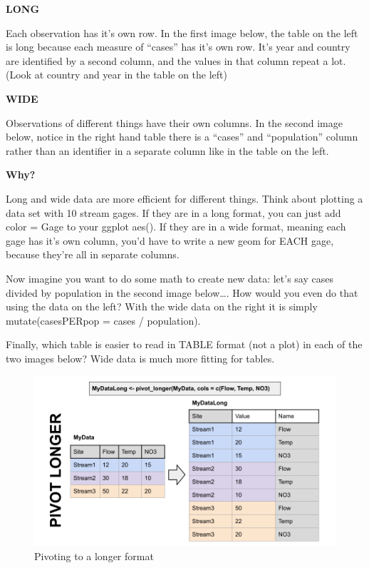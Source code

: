 \documentclass[
]{book}
\begin{document}
\textbf{LONG}

Each observation has it's own row. In the first image below, the table on the left is long because each measure of ``cases'' has it's own row. It's year and country are identified by a second column, and the values in that column repeat a lot. (Look at country and year in the table on the left)

\textbf{WIDE}

Observations of different things have their own columns. In the second image below, notice in the right hand table there is a ``cases'' and ``population'' column rather than an identifier in a separate column like in the table on the left.

\textbf{Why?}

Long and wide data are more efficient for different things. Think about plotting a data set with 10 stream gages. If they are in a long format, you can just add color = Gage to your ggplot aes(). If they are in a wide format, meaning each gage has it's own column, you'd have to write a new geom for EACH gage, because they're all in separate columns.

Now imagine you want to do some math to create new data: let's say cases divided by population in the second image below\ldots. How would you even do that using the data on the left? With the wide data on the right it is simply mutate(casesPERpop = cases / population).

Finally, which table is easier to read in TABLE format (not a plot) in each of the two images below? Wide data is much more fitting for tables.

\begin{figure}
\centering
\includegraphics{images/pivot_longer.png}
\caption{Pivoting to a longer format}
\end{figure}
\end{document}
